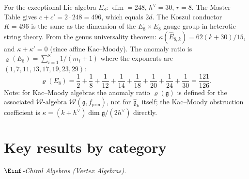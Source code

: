 \begin{remark}\label{rem:e8-complementarity}
For the exceptional Lie algebra $E_8$: $\dim = 248$, $h^\vee = 30$, $r = 8$.  The Master Table gives $c + c' = 2 \cdot 248 = 496$, which equals $2d$.  The Koszul conductor $K = 496$ is the same as the dimension of the $E_8 \times E_8$ gauge group in heterotic string theory.  From the genus universality theorem: $\kappa(\widehat{E}_{8,k}) = 62(k+30)/15$, and $\kappa + \kappa' = 0$ (since affine Kac--Moody).  The anomaly ratio is $\varrho(E_8) = \sum_{i=1}^8 1/(m_i+1)$ where the exponents are $(1,7,11,13,17,19,23,29)$:
\[
\varrho(E_8) = \frac{1}{2} + \frac{1}{8} + \frac{1}{12} + \frac{1}{14} + \frac{1}{18} + \frac{1}{20} + \frac{1}{24} + \frac{1}{30} = \frac{121}{126}.
\]
Note: for Kac--Moody algebras the anomaly ratio $\varrho(\mathfrak{g})$ is defined for the associated $\mathcal{W}$-algebra $\mathcal{W}(\mathfrak{g}, f_{\mathrm{prin}})$, not for $\widehat{\mathfrak{g}}_k$ itself; the Kac--Moody obstruction coefficient is $\kappa = (k+h^\vee)\dim\mathfrak{g}/(2h^\vee)$ directly.
\end{remark}

\section*{Key results by category}

\emph{$\Einf$-Chiral Algebras (Vertex Algebras).}

